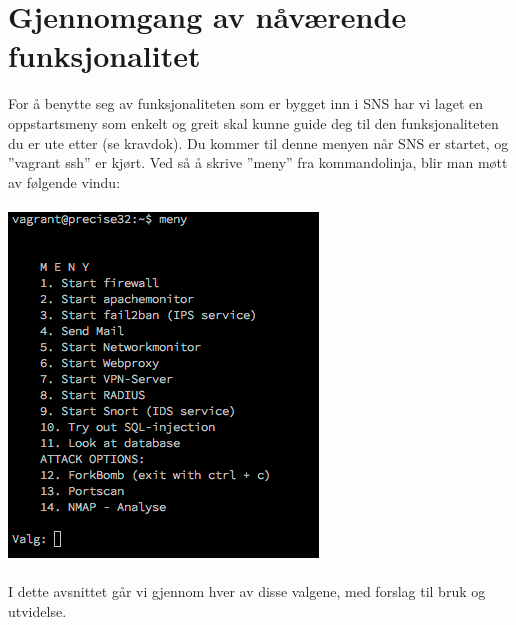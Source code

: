\documentclass{article}
\begin{document}
\section{Gjennomgang av nåværende funksjonalitet}
For å benytte seg av funksjonaliteten som er bygget inn i SNS har vi laget en oppstartsmeny som enkelt og greit skal kunne guide deg til den funksjonaliteten du er ute etter (se kravdok). Du kommer til denne menyen når SNS er startet, og ''vagrant ssh'' er kjørt. Ved så å skrive ''meny'' fra kommandolinja, blir man møtt av følgende vindu: 
\\ \\
\includegraphics[scale=0.8]{pictures/meny.png} 
\\ \\
I dette avsnittet går vi gjennom hver av disse valgene, med forslag til bruk og utvidelse.  
\end{document}
